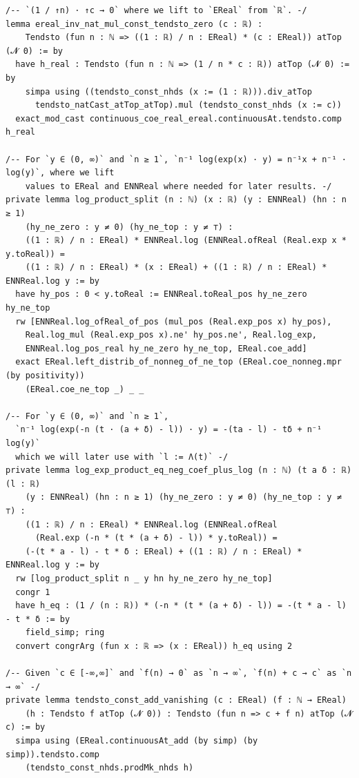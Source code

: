\newpage
\begin{lstlisting}
/-- `(1 / ↑n) · ↑c → 0` where we lift to `EReal` from `ℝ`. -/
lemma ereal_inv_nat_mul_const_tendsto_zero (c : ℝ) :
    Tendsto (fun n : ℕ => ((1 : ℝ) / n : EReal) * (c : EReal)) atTop (𝓝 0) := by
  have h_real : Tendsto (fun n : ℕ => (1 / n * c : ℝ)) atTop (𝓝 0) := by
    simpa using ((tendsto_const_nhds (x := (1 : ℝ))).div_atTop
      tendsto_natCast_atTop_atTop).mul (tendsto_const_nhds (x := c))
  exact_mod_cast continuous_coe_real_ereal.continuousAt.tendsto.comp h_real

/-- For `y ∈ (0, ∞)` and `n ≥ 1`, `n⁻¹ log(exp(x) · y) = n⁻¹x + n⁻¹ · log(y)`, where we lift
    values to EReal and ENNReal where needed for later results. -/
private lemma log_product_split (n : ℕ) (x : ℝ) (y : ENNReal) (hn : n ≥ 1)
    (hy_ne_zero : y ≠ 0) (hy_ne_top : y ≠ ⊤) :
    ((1 : ℝ) / n : EReal) * ENNReal.log (ENNReal.ofReal (Real.exp x * y.toReal)) =
    ((1 : ℝ) / n : EReal) * (x : EReal) + ((1 : ℝ) / n : EReal) * ENNReal.log y := by
  have hy_pos : 0 < y.toReal := ENNReal.toReal_pos hy_ne_zero hy_ne_top
  rw [ENNReal.log_ofReal_of_pos (mul_pos (Real.exp_pos x) hy_pos),
    Real.log_mul (Real.exp_pos x).ne' hy_pos.ne', Real.log_exp,
    ENNReal.log_pos_real hy_ne_zero hy_ne_top, EReal.coe_add]
  exact EReal.left_distrib_of_nonneg_of_ne_top (EReal.coe_nonneg.mpr (by positivity))
    (EReal.coe_ne_top _) _ _

/-- For `y ∈ (0, ∞)` and `n ≥ 1`,
  `n⁻¹ log(exp(-n (t · (a + δ) - l)) · y) = -(ta - l) - tδ + n⁻¹ log(y)`
  which we will later use with `l := Λ(t)` -/
private lemma log_exp_product_eq_neg_coef_plus_log (n : ℕ) (t a δ : ℝ) (l : ℝ)
    (y : ENNReal) (hn : n ≥ 1) (hy_ne_zero : y ≠ 0) (hy_ne_top : y ≠ ⊤) :
    ((1 : ℝ) / n : EReal) * ENNReal.log (ENNReal.ofReal
      (Real.exp (-n * (t * (a + δ) - l)) * y.toReal)) =
    (-(t * a - l) - t * δ : EReal) + ((1 : ℝ) / n : EReal) * ENNReal.log y := by
  rw [log_product_split n _ y hn hy_ne_zero hy_ne_top]
  congr 1
  have h_eq : (1 / (n : ℝ)) * (-n * (t * (a + δ) - l)) = -(t * a - l) - t * δ := by
    field_simp; ring
  convert congrArg (fun x : ℝ => (x : EReal)) h_eq using 2

/-- Given `c ∈ [-∞,∞]` and `f(n) → 0` as `n → ∞`, `f(n) + c → c` as `n → ∞` -/
private lemma tendsto_const_add_vanishing (c : EReal) (f : ℕ → EReal)
    (h : Tendsto f atTop (𝓝 0)) : Tendsto (fun n => c + f n) atTop (𝓝 c) := by
  simpa using (EReal.continuousAt_add (by simp) (by simp)).tendsto.comp
    (tendsto_const_nhds.prodMk_nhds h)
\end{lstlisting}
